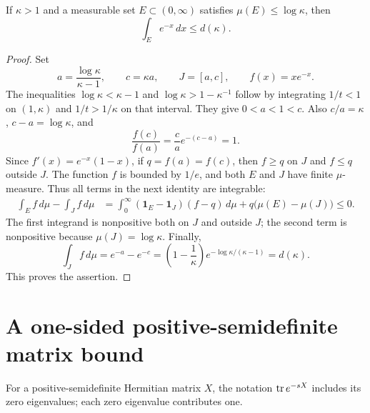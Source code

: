\begin{hrklemma}\label{hrk:lem:scalar}
If $\kappa>1$ and a measurable set $E\subset(0,\infty)$ satisfies
$\mu(E)\leq\log\kappa$, then
\begin{equation}\label{hrk:eq:integral-bound}
 \int_E e^{-x}\,dx\leq d(\kappa).
\end{equation}
\end{hrklemma}
\begin{proof}
Set
\[
 a=\frac{\log\kappa}{\kappa-1},\qquad
 c=\kappa a,\qquad J=[a,c],\qquad f(x)=xe^{-x}.
\]
The inequalities
$\log\kappa<\kappa-1$ and
$\log\kappa>1-\kappa^{-1}$ follow by integrating $1/t<1$
on $(1,\kappa)$ and $1/t>1/\kappa$ on that interval.
They give $0<a<1<c$. Also $c/a=\kappa$,
$c-a=\log\kappa$, and
\[
 \frac{f(c)}{f(a)}=\frac ca e^{-(c-a)}=1.
\]
Since $f'(x)=e^{-x}(1-x)$, if $q=f(a)=f(c)$, then
$f\geq q$ on $J$ and $f\leq q$ outside $J$.
The function $f$ is bounded by $1/e$, and both $E$ and $J$ have
finite $\mu$-measure. Thus all terms in the next identity are integrable:
\begin{align*}
 \int_E f\,d\mu-\int_J f\,d\mu
 &=\int_0^\infty(\mathbf1_E-\mathbf1_J)(f-q)\,d\mu
       +q\bigl(\mu(E)-\mu(J)\bigr)\leq0.
\end{align*}
The first integrand is nonpositive both on $J$ and outside $J$;
the second term is nonpositive because $\mu(J)=\log\kappa$.
Finally,
\[
 \int_J f\,d\mu=e^{-a}-e^{-c}
  =\left(1-\frac1\kappa\right)e^{-\log\kappa/(\kappa-1)}
  =d(\kappa).
\]
This proves the assertion.
\end{proof}

\section{A one-sided positive-semidefinite matrix bound}
For a positive-semidefinite Hermitian matrix $X$, the notation
$\operatorname{tr} e^{-sX}$ includes its zero eigenvalues; each zero eigenvalue
contributes one.

